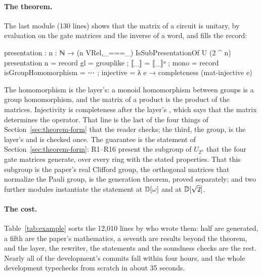 \paragraph{The theorem.} The last module (130 lines) shows that the
matrix of a circuit is unitary, by evaluation on the gate matrices and
the inverse of a word, and fills the record:
\begin{agdacode}
presentation : {n : ℕ} → (n VRel,_===_) IsSubPresentationOf U (2 ^ n)
presentation {n} = record
  { gl   = grouplike
  ; ⟦_⟧  = ⟦_⟧ᵘ
  ; mono = record { isGroupHomomorphism = ⋯
                  ; injective = λ e → completeness (mat-injective e) } }
\end{agdacode}
The homomorphism is the layer's: a monoid homomorphism between groups
is a group homomorphism, and the matrix of a product is the product of
the matrices. Injectivity is completeness after the layer's
, which says that the matrix determines the
operator. That line is the last of the four things of
Section~\ref{sec:theorem-form} that the reader checks; the third, the
group, is the layer's and is checked once. The guarantee is the
statement of Section~\ref{sec:theorem-form}: R1--R16 present the
subgroup of $U_{2^n}$ that the four gate matrices generate, over every
ring with the stated properties. That this subgroup is the paper's
real Clifford group, the orthogonal matrices that normalize the Pauli
group, is the generation theorem, proved separately; and two further
modules instantiate the statement at $\mathbb{D}[\omega]$ and at $\mathbb{D}[\sqrt2]$.

\paragraph{The cost.} Table~\ref{tab:example} sorts the 12{,}010 lines
by who wrote them: half are generated, a fifth are the paper's
mathematics, a seventh are results beyond the theorem, and the layer,
the rewriter, the statements and the soundness checks are the rest.
Nearly all of the development's commits fall within four hours, and
the whole development typechecks from scratch in about 35 seconds.

